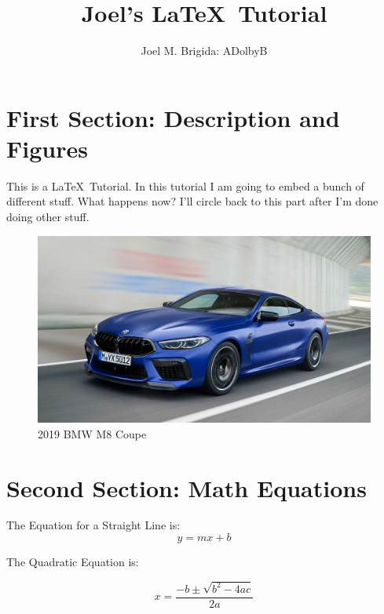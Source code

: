 \documentclass[12pt,letterpaper]{article}
\begin{document}
\title{Joel's \LaTeX\ Tutorial}
\author{Joel M. Brigida: ADolbyB}
\maketitle %

\pagebreak

\tableofcontents

\pagebreak

\section{First Section: Description and Figures}

This is a \LaTeX\ Tutorial. In this tutorial I am going to embed a bunch of different stuff. What happens now?
I'll circle back to this part after I'm done doing other stuff.

\medskip

\begin{figure}[h!] %
    \center
    \includegraphics[width=\linewidth]{2019m8.jpg}
    \caption{2019 BMW M8 Coupe}
\end{figure}

\pagebreak

\section{Second Section: Math Equations}

The Equation for a Straight Line is:
\begin{equation}
    y = mx + b
\end{equation}

The Quadratic Equation is:

\begin{equation}
    x = \frac{-b \pm \sqrt{b^2 - 4ac}}{2a}
\end{equation}
\medskip
\end{document}
